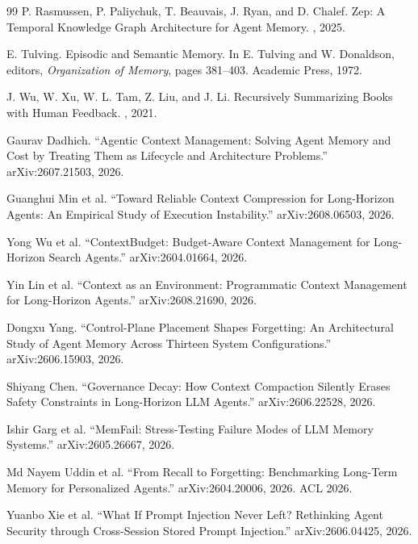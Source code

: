\begin{thebibliography}{99}
P. Rasmussen, P. Paliychuk, T. Beauvais, J. Ryan, and D. Chalef.
\newblock Zep: A Temporal Knowledge Graph Architecture for Agent Memory.
, 2025.

E. Tulving.
\newblock Episodic and Semantic Memory.
\newblock In E. Tulving and W. Donaldson, editors, {\em Organization of Memory}, pages 381--403. Academic Press, 1972.

J. Wu, W. Xu, W. L. Tam, Z. Liu, and J. Li.
\newblock Recursively Summarizing Books with Human Feedback.
, 2021.


Gaurav Dadhich.
``Agentic Context Management: Solving Agent Memory and Cost by Treating Them as Lifecycle and Architecture Problems.''
arXiv:2607.21503, 2026.

Guanghui Min et al.
``Toward Reliable Context Compression for Long-Horizon Agents: An Empirical Study of Execution Instability.''
arXiv:2608.06503, 2026.

Yong Wu et al.
``ContextBudget: Budget-Aware Context Management for Long-Horizon Search Agents.''
arXiv:2604.01664, 2026.

Yin Lin et al.
``Context as an Environment: Programmatic Context Management for Long-Horizon Agents.''
arXiv:2608.21690, 2026.

Dongxu Yang.
``Control-Plane Placement Shapes Forgetting: An Architectural Study of Agent Memory Across Thirteen System Configurations.''
arXiv:2606.15903, 2026.

Shiyang Chen.
``Governance Decay: How Context Compaction Silently Erases Safety Constraints in Long-Horizon LLM Agents.''
arXiv:2606.22528, 2026.

Ishir Garg et al.
``MemFail: Stress-Testing Failure Modes of LLM Memory Systems.''
arXiv:2605.26667, 2026.

Md Nayem Uddin et al.
``From Recall to Forgetting: Benchmarking Long-Term Memory for Personalized Agents.''
arXiv:2604.20006, 2026. ACL 2026.

Yuanbo Xie et al.
``What If Prompt Injection Never Left? Rethinking Agent Security through Cross-Session Stored Prompt Injection.''
arXiv:2606.04425, 2026.


\end{thebibliography}
